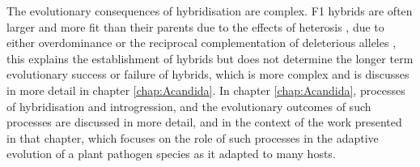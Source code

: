 The evolutionary consequences of hybridisation are complex.
F1 hybrids are often larger and more fit than their parents due to the effects of heterosis \parencite{Lippman2007}, due to either overdominance or the reciprocal complementation of deleterious alleles \parencite{ClarkCockerham1996}, this explains the establishment of hybrids but does not determine the longer term evolutionary success or failure of hybrids, which is more complex and is discusses in more detail in chapter \ref{chap:Acandida}.
In chapter \ref{chap:Acandida}, processes of hybridisation and introgression, and the evolutionary outcomes of such processes are discussed in more detail, and in the context of the work presented in that chapter, which focuses on the role of such processes in the adaptive evolution of a plant pathogen species as it adapted to many hosts.
